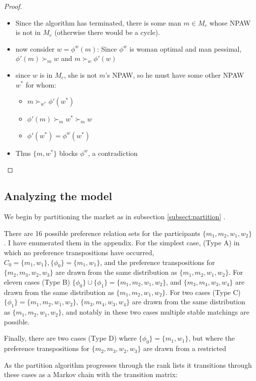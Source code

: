 \documentclass[WP]{AEA}
\begin{document}
\begin{proof}
\begin{enumerate}
\begin{itemize}
			\item Since the algorithm has terminated, there is some man $m \in M_c$ whose NPAW is not in  $M_c$ (otherwise there would be a cycle).  
			\item now consider $w = \phi^w(m)$: Since $\phi^w$ is woman optimal and man pessimal, $ \phi'(m)\succ_m w$ and $m \succ_w \phi'(w)$
			\item since $w$ is in $M_c$, she is not $m$'s NPAW, so he must have some other NPAW $w^*$ for whom:
			\begin{itemize}
				\item $m \succ_{w^*} \phi'(w^*)$
				\item $\phi'(m) \succ_m w^* \succ_m w$
				\item $\phi'(w^*) = \phi^w(w^*)$
			\end{itemize} 
			\item Thus $\{m,w^*\}$ blocks $\phi^w$, a contradiction
		\end{itemize}
	\end{enumerate}
\end{proof}

\subsection{Analyzing the model}

We begin by partitioning the market as in subsection \ref{subsect:partition} . 

There are 16 possible preference relation sets for the participants $\{m_1,m_2,w_1,w_2\}$.  I have enumerated them in the appendix. For the simplest case, (Type A) in which no preference transpositions have occurred, $C_0 =\{m_1,w_1\}, \{\phi_0\}=\{m_1,w_1\}$, and the preference transpositions for  $\{m_2,m_3,w_2,w_3\}$ are drawn from the same distribution as $\{m_1,m_2,w_1,w_2\}$.  For eleven cases (Type B)  $ \{\phi_0\} \cup \{\phi_1\}=\{m_1,m_2,w_1,w_2\} $, and $\{m_3,m_4,w_3,w_4\}$ are drawn from the same distribution as $\{m_1,m_2,w_1,w_2\}$. For two cases (Type C)  $\{\phi_1\}=\{m_1,m_2,w_1,w_2\}$, $\{m_3,m_4,w_3,w_4\}$ are drawn from the same distribution as $\{m_1,m_2,w_1,w_2\}$, and notably in these two cases  multiple stable matchings are possible.

Finally, there are two cases (Type D) where $\{\phi_0\}=\{m_1,w_1\}$, but where the preference transpositions for  $\{m_2,m_3,w_2,w_3\}$ are drawn from a restricted 

As the partition algorithm progresses through the rank lists it transitions through these cases as a Markov chain with the transition matrix:
\end{document}
